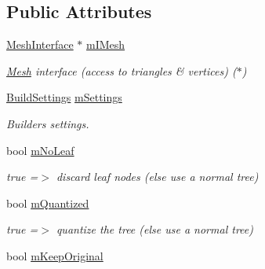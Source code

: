 \subsection*{Public Attributes}
\begin{DoxyCompactItemize}
\item 
\hyperlink{classMeshInterface}{Mesh\+Interface} $\ast$ \hyperlink{structOPCODECREATE_a1797bb4e55484972aa0c83d830df6c05}{m\+I\+Mesh}\hypertarget{structOPCODECREATE_a1797bb4e55484972aa0c83d830df6c05}{}\label{structOPCODECREATE_a1797bb4e55484972aa0c83d830df6c05}

\begin{DoxyCompactList}\small\item\em \hyperlink{classMesh}{Mesh} interface (access to triangles \& vertices) ($\ast$) \end{DoxyCompactList}\item 
\hyperlink{structBuildSettings}{Build\+Settings} \hyperlink{structOPCODECREATE_ab64e53cba4de4c506a1c4f9458c0e399}{m\+Settings}\hypertarget{structOPCODECREATE_ab64e53cba4de4c506a1c4f9458c0e399}{}\label{structOPCODECREATE_ab64e53cba4de4c506a1c4f9458c0e399}

\begin{DoxyCompactList}\small\item\em Builder\textquotesingle{}s settings. \end{DoxyCompactList}\item 
bool \hyperlink{structOPCODECREATE_a5698360d25cc867eedc114ee0241383d}{m\+No\+Leaf}\hypertarget{structOPCODECREATE_a5698360d25cc867eedc114ee0241383d}{}\label{structOPCODECREATE_a5698360d25cc867eedc114ee0241383d}

\begin{DoxyCompactList}\small\item\em true =$>$ discard leaf nodes (else use a normal tree) \end{DoxyCompactList}\item 
bool \hyperlink{structOPCODECREATE_a8e8a898314866de0c9cfaa0015293dbd}{m\+Quantized}\hypertarget{structOPCODECREATE_a8e8a898314866de0c9cfaa0015293dbd}{}\label{structOPCODECREATE_a8e8a898314866de0c9cfaa0015293dbd}

\begin{DoxyCompactList}\small\item\em true =$>$ quantize the tree (else use a normal tree) \end{DoxyCompactList}\item 
bool \hyperlink{structOPCODECREATE_a929f76c3fef9815a8964b11c52f12150}{m\+Keep\+Original}\hypertarget{structOPCODECREATE_a929f76c3fef9815a8964b11c52f12150}{}\label{structOPCODECREATE_a929f76c3fef9815a8964b11c52f12150}


\end{DoxyCompactItemize}
